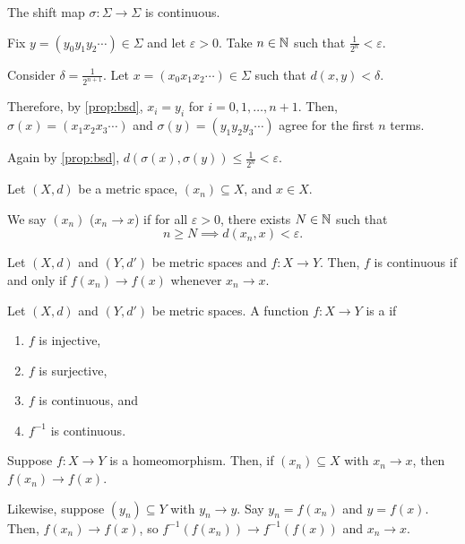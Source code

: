 \documentclass[class=pmath370,tikz,notes]{agony}
\begin{document}
\begin{prop}
  The shift map $\sigma : \Sigma \to \Sigma$ is continuous.
\end{prop}
\begin{prf}
  Fix $y = (y_0y_1y_2\cdots) \in \Sigma$ and let $\varepsilon > 0$.
  Take $n \in \mathbb{N}$ such that $\frac{1}{2^n} < \varepsilon$.

  Consider $\delta = \frac{1}{2^{n+1}}$.
  Let $x = (x_0x_1x_2\cdots) \in \Sigma$ such that $d(x,y) < \delta$.

  Therefore, by \cref{prop:bsd}, $x_i = y_i$ for $i = 0,1,\dotsc,n+1$.
  Then, $\sigma(x) = (x_1x_2x_3\cdots)$ and $\sigma(y) = (y_1y_2y_3\cdots)$
  agree for the first $n$ terms.

  Again by \cref{prop:bsd}, $d(\sigma(x),\sigma(y)) \leq \frac{1}{2^n} < \varepsilon$.
\end{prf}

\begin{defn*}
  Let $(X,d)$ be a metric space, $(x_n) \subseteq X$, and $x \in X$.

  We say $(x_n)$ 
  ($x_n \to x$) if for all $\varepsilon > 0$, there exists $N \in \mathbb{N}$
  such that \[ n \geq N \implies d(x_n,x) < \varepsilon. \]
\end{defn*}

\begin{prop}
  Let $(X,d)$ and $(Y,d')$ be metric spaces and $f : X \to Y$.
  Then, $f$ is continuous if and only if $f(x_n) \to f(x)$
  whenever $x_n \to x$.
\end{prop}

\begin{defn}[homeomorphism]
  Let $(X,d)$ and $(Y,d')$ be metric spaces.
  A function $f : X \to Y$ is a  if
  \begin{enumerate}[nosep]
    \item $f$ is injective,
    \item $f$ is surjective,
    \item $f$ is continuous, and
    \item $f^{-1}$ is continuous.
  \end{enumerate}
\end{defn}

Suppose $f : X \to Y$ is a homeomorphism.
Then, if $(x_n) \subseteq X$ with $x_n \to x$,
then $f(x_n) \to f(x)$.

Likewise, suppose $(y_n) \subseteq Y$ with $y_n \to y$.
Say $y_n = f(x_n)$ and $y = f(x)$.
Then, $f(x_n) \to f(x)$,
so $f^{-1}(f(x_n)) \to f^{-1}(f(x))$
and $x_n \to x$.
\end{document}
